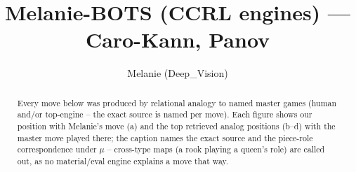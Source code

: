 \documentclass[11pt]{article}
\title{Melanie-BOTS (CCRL engines) — Caro-Kann, Panov}
\author{Melanie (Deep\_Vision)}
\date{}
\begin{document}
\maketitle

\begin{abstract}Every move below was produced by relational analogy to named master games (human and/or top-engine -- the exact source is named per move). Each figure shows our position with Melanie's move (a) and the top retrieved analog positions (b--d) with the master move played there; the caption names the exact source and the piece-role correspondence under $\mu$ -- cross-type maps (a rook playing a queen's role) are called out, as no material/eval engine explains a move that way.\end{abstract}

\begin{figure}[p]\centering
\begin{subfigure}{0.46\textwidth}\centering
\resizebox{\linewidth}{!}{%
\newchessgame
\chessboard[
  setfen={rnbqk2r/pp2bppp/4pn2/3p4/2PP4/2N2N2/PP3PPP/R1BQKB1R w KQkq - 2 7},
  showmover=false,
  pgfstyle=straightmove, color=movearrow, markmove={c4-c5}
]}
\caption{}
\end{subfigure}\hfill
\begin{subfigure}{0.46\textwidth}\centering
\resizebox{\linewidth}{!}{%
\newchessgame
\chessboard[
  setfen={r1bqkb1r/pp3ppp/2n1pn2/3p4/2PP4/2N2N2/PP3PPP/R1BQKB1R w KQkq - 0 7},
  showmover=false,
  pgfstyle=straightmove, color=movearrow, markmove={c4-c5}
]}
\caption{}
\end{subfigure}
\\[4pt]
\begin{subfigure}{0.46\textwidth}\centering
\resizebox{\linewidth}{!}{%
\newchessgame
\chessboard[
  setfen={r1bqkb1r/pp3ppp/2n1pn2/3p4/2PP4/2N2N2/PP3PPP/R1BQKB1R w KQkq - 0 7},
  showmover=false,
  pgfstyle=straightmove, color=movearrow, markmove={c4-c5}
]}
\caption{}
\end{subfigure}\hfill
\begin{subfigure}{0.46\textwidth}\centering
\resizebox{\linewidth}{!}{%
\newchessgame
\chessboard[
  setfen={r1bqkb1r/pp3ppp/2n1pn2/3p4/2PP4/2N2N2/PP3PPP/R1BQKB1R w KQkq - 0 7},
  showmover=false,
  pgfstyle=straightmove, color=movearrow, markmove={c4-c5}
]}
\caption{}
\end{subfigure}

\end{figure}
\end{document}
